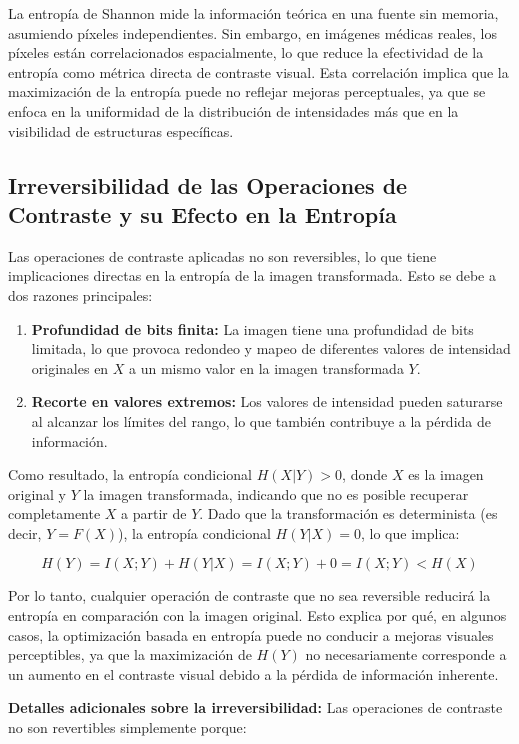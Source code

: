 La entropía de Shannon mide la información teórica en una fuente sin memoria, asumiendo píxeles independientes. Sin embargo, en imágenes médicas reales, los píxeles están correlacionados espacialmente, lo que reduce la efectividad de la entropía como métrica directa de contraste visual. Esta correlación implica que la maximización de la entropía puede no reflejar mejoras perceptuales, ya que se enfoca en la uniformidad de la distribución de intensidades más que en la visibilidad de estructuras específicas.

\subsection{Irreversibilidad de las Operaciones de Contraste y su Efecto en la Entropía}
Las operaciones de contraste aplicadas no son reversibles, lo que tiene implicaciones directas en la entropía de la imagen transformada. Esto se debe a dos razones principales:

\begin{enumerate}
    \item \textbf{Profundidad de bits finita:} La imagen tiene una profundidad de bits limitada, lo que provoca redondeo y mapeo de diferentes valores de intensidad originales en \(X\) a un mismo valor en la imagen transformada \(Y\).
    \item \textbf{Recorte en valores extremos:} Los valores de intensidad pueden saturarse al alcanzar los límites del rango, lo que también contribuye a la pérdida de información.
\end{enumerate}

Como resultado, la entropía condicional \(H(X|Y) > 0\), donde \(X\) es la imagen original y \(Y\) la imagen transformada, indicando que no es posible recuperar completamente \(X\) a partir de \(Y\). Dado que la transformación es determinista (es decir, \(Y = F(X)\)), la entropía condicional \(H(Y|X) = 0\), lo que implica:

\[
H(Y) = I(X;Y) + H(Y|X) = I(X;Y) + 0 = I(X;Y) < H(X)
\]

Por lo tanto, cualquier operación de contraste que no sea reversible reducirá la entropía en comparación con la imagen original. Esto explica por qué, en algunos casos, la optimización basada en entropía puede no conducir a mejoras visuales perceptibles, ya que la maximización de \(H(Y)\) no necesariamente corresponde a un aumento en el contraste visual debido a la pérdida de información inherente.

\textbf{Detalles adicionales sobre la irreversibilidad:} Las operaciones de contraste no son revertibles simplemente porque:

